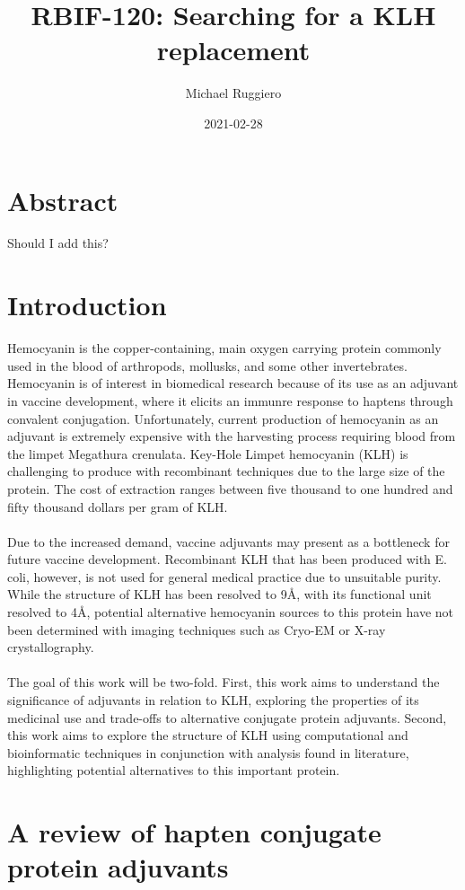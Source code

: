 \documentclass[a4paper]{article}
\title{RBIF-120: Searching for a KLH replacement}
\author{Michael Ruggiero}
\date{2021-02-28}
\begin{document}
\maketitle
\clearpage

\section{Abstract}
Should I add this?
\section{Introduction}
Hemocyanin is the copper-containing, main oxygen carrying protein commonly used in the blood of arthropods, mollusks, and some other invertebrates. Hemocyanin is of interest in biomedical research because of its use as an adjuvant in vaccine development, where it elicits an immunre response to haptens through convalent conjugation. Unfortunately, current production of hemocyanin as an adjuvant is extremely expensive with the harvesting process requiring blood from the limpet Megathura crenulata. Key-Hole Limpet hemocyanin (KLH) is challenging to produce with recombinant techniques due to the large size of the protein. The cost of extraction ranges between five thousand to one hundred and fifty thousand dollars per gram of KLH.   \\\\
Due to the increased demand, vaccine adjuvants may present as a bottleneck for future vaccine development. Recombinant KLH that has been produced with E. coli, however, is not used for general medical practice due to unsuitable purity. While the structure of KLH has been resolved to 9\AA , with its functional unit resolved to 4\AA, potential alternative hemocyanin sources to this protein have not been determined with imaging techniques such as Cryo-EM or X-ray crystallography. \\\\
The goal of this work will be two-fold.  First, this work aims to understand the significance of adjuvants in relation to KLH, exploring the properties of its medicinal use and trade-offs to alternative conjugate protein adjuvants. Second, this work aims to explore the structure of KLH using computational and bioinformatic techniques in conjunction with analysis found in literature, highlighting potential alternatives to this important protein. 

\section{A review of hapten conjugate protein adjuvants}
\end{document}
